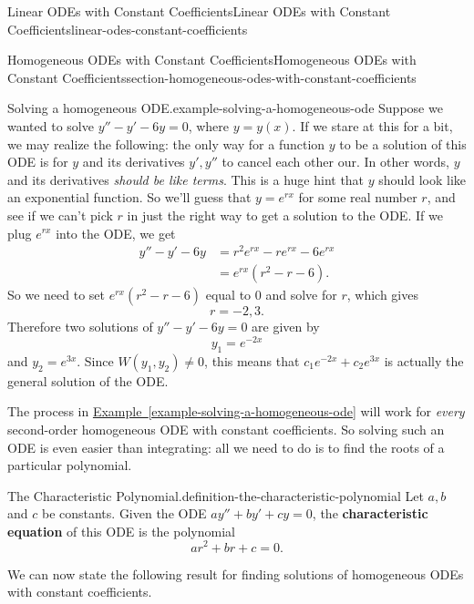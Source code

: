 \documentclass[oneside,10pt,]{book}
\newcommand{\terminology}[1]{\textbf{#1}}
\numberwithin{equation}{section}
\newcommand{\amp}{&}
\begin{document}
\begin{chapterptx}{Linear ODEs with Constant Coefficients}{}{Linear ODEs with Constant Coefficients}{}{}{linear-odes-constant-coefficients}
\begin{sectionptx}{Homogeneous ODEs with Constant Coefficients}{}{Homogeneous ODEs with Constant Coefficients}{}{}{section-homogeneous-odes-with-constant-coefficients}
\begin{example}{Solving a homogeneous ODE.}{example-solving-a-homogeneous-ode}%
\hypertarget{p-180}{}%
Suppose we wanted to solve \(y'' - y' - 6y = 0\), where \(y=y(x)\). If we stare at this for a bit, we may realize the following: the only way for a function \(y\) to be a solution of this ODE is for \(y\) and its derivatives \(y',y''\) to cancel each other our. In other words, \(y\) and its derivatives \emph{should be like terms}. This is a huge hint that \(y\) should look like an exponential function. So we'll guess that \(y = e^{rx}\) for some real number \(r\), and see if we can't pick \(r\) in just the right way to get a solution to the ODE. If we plug \(e^{rx}\) into the ODE, we get%
%
\begin{align*}
y''- y' - 6y \amp = r^{2}e^{rx} - re^{rx} - 6e^{rx} \\
\amp = e^{rx}(r^{2} - r - 6). 
\end{align*}
\hypertarget{p-181}{}%
So we need to set \(e^{rx}(r^{2} - r - 6)\) equal to \(0\) and solve for \(r\), which gives%
\begin{equation*}
r = -2, 3.
\end{equation*}
Therefore two solutions of \(y'' - y' - 6y = 0\) are given by%
\begin{equation*}
y_{1} = e^{-2x}
\end{equation*}
and \(y_{2} = e^{3x}\). Since \(W(y_{1},y_{2})\neq0\), this means that \(c_{1}e^{-2x} + c_{2}e^{3x}\) is actually the general solution of the ODE.%
\end{example}
\hypertarget{p-182}{}%
The process in \hyperref[example-solving-a-homogeneous-ode]{Example~\ref{example-solving-a-homogeneous-ode}} will work for \emph{every} second-order homogeneous ODE with constant coefficients. So solving such an ODE is even easier than integrating: all we need to do is to find the roots of a particular polynomial.%
\begin{definition}{The Characteristic Polynomial.}{definition-the-characteristic-polynomial}%
\hypertarget{p-183}{}%
Let \(a,b\) and \(c\) be constants. Given the ODE \(ay'' + by' + cy = 0\), the \terminology{characteristic equation} of this ODE is the polynomial%
\begin{equation*}
ar^{2} + br + c = 0.
\end{equation*}
%
\end{definition}
\hypertarget{p-184}{}%
We can now state the following result for finding solutions of homogeneous ODEs with constant coefficients.%

\end{sectionptx}
\end{chapterptx}
\end{document}
